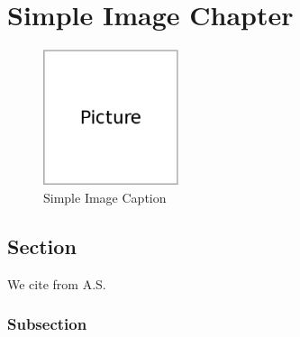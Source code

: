 \chapter{Simple Image Chapter}

\begin{figure}[htp] %
	\centering
	\includegraphics[width=150px]{img/picture}
	\caption{Simple Image Caption}
\end{figure}

\section{Section}

We cite from A.S.~\cite[p.~48]{book00}

\subsection{Subsection}